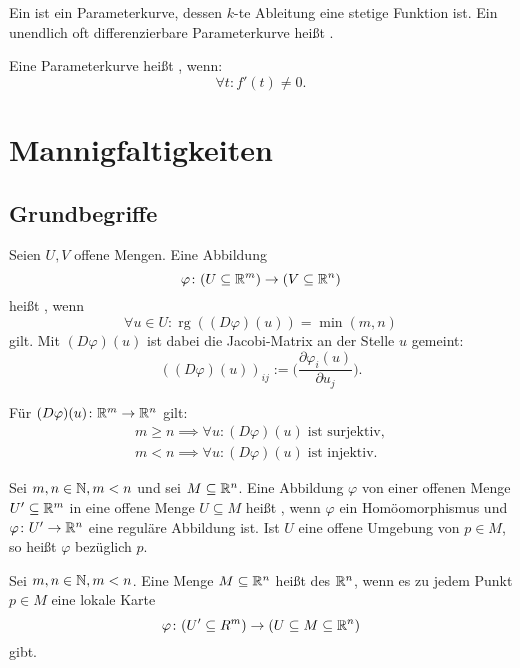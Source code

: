 Ein  ist ein Parameterkurve, dessen $k$-te Ableitung
eine stetige Funktion ist. Ein unendlich oft differenzierbare
Parameterkurve heißt .

Eine Parameterkurve heißt , wenn:
\begin{equation}
\forall t\colon f'(t)\ne 0.
\end{equation}

\section{Mannigfaltigkeiten}
\subsection{Grundbegriffe}
\begin{Definition}
Seien $U,V$ offene Mengen. Eine Abbildung
\begin{equation}
\varphi\colon (U\subseteq\mathbb R^m)\to(V\subseteq\mathbb R^n)
\end{equation}
heißt , wenn
\begin{equation}
\forall u\in U\colon \operatorname{rg}((D\varphi)(u))=\min(m,n)
\end{equation}
gilt. Mit $(D\varphi)(u)$ ist dabei die Jacobi-Matrix an der Stelle
$u$ gemeint:
\begin{equation}
((D\varphi)(u))_{ij} := \bigg(\frac{\partial\varphi_i(u)}{\partial u_j}\bigg).
\end{equation}
\end{Definition}
\noindent
Für $(D\varphi)(u)\colon\mathbb R^m\to\mathbb R^n$ gilt:
\begin{gather}
m{\ge}n\implies\forall u\colon (D\varphi)(u)\;\text{ist surjektiv},\\
m{<}n\implies\forall u\colon (D\varphi)(u)\;\text{ist injektiv}.
\end{gather}

\begin{Definition}
Sei $m,n\in\mathbb N, m<n$ und sei $M\subseteq\mathbb R^n$.
Eine Abbildung $\varphi$ von einer offenen Menge $U'\subseteq\mathbb R^m$
in eine offene Menge $U\subseteq M$ heißt ,
wenn $\varphi$ ein Homöomorphismus und $\varphi\colon U'\to\mathbb R^n$
eine reguläre Abbildung ist. Ist $U$ eine offene Umgebung von
$p\in M$, so heißt $\varphi$  bezüglich $p$.
\end{Definition}
\pagebreak[1]
\begin{Definition}
Sei $m,n\in\mathbb N, m<n$. Eine Menge $M\subseteq\mathbb R^n$ heißt
 des $\mathbb R^n$, wenn
es zu jedem Punkt $p\in M$ eine lokale Karte
\begin{equation}
\varphi\colon (U'\subseteq R^m)\to (U\subseteq M\subseteq\mathbb R^n)
\end{equation}
gibt.
\end{Definition}

